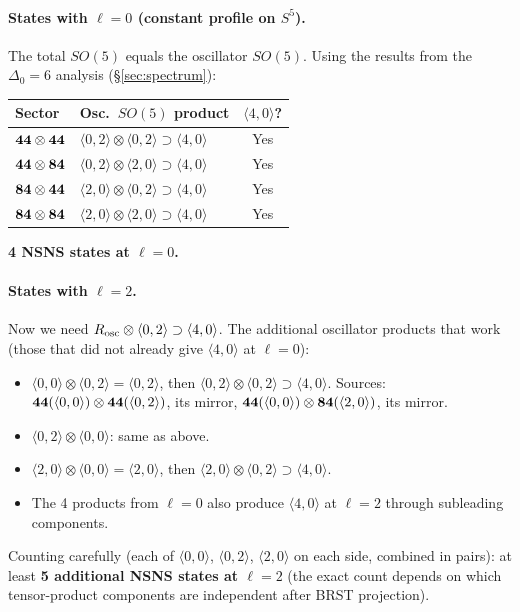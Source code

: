 \documentclass[12pt]{article}
\newcommand{\D}{\ensuremath{\Delta}}
\begin{document}
\paragraph{States with $\ell=0$ (constant profile on $S^5$).}
The total $SO(5)$ equals the oscillator $SO(5)$. Using the results from the
$\D_0=6$ analysis (\S\ref{sec:spectrum}):
\begin{center}
\begin{tabular}{|l|l|c|}
\hline
Sector & Osc.\ $SO(5)$ product & $\langle 4,0\rangle$? \\
\hline
${\bf 44}\otimes{\bf 44}$ & $\langle 0,2\rangle\otimes\langle 0,2\rangle\supset\langle 4,0\rangle$ & Yes \\
${\bf 44}\otimes{\bf 84}$ & $\langle 0,2\rangle\otimes\langle 2,0\rangle\supset\langle 4,0\rangle$ & Yes \\
${\bf 84}\otimes{\bf 44}$ & $\langle 2,0\rangle\otimes\langle 0,2\rangle\supset\langle 4,0\rangle$ & Yes \\
${\bf 84}\otimes{\bf 84}$ & $\langle 2,0\rangle\otimes\langle 2,0\rangle\supset\langle 4,0\rangle$ & Yes \\
\hline
\end{tabular}
\end{center}
\textbf{4 NSNS states at $\ell=0$.}

\paragraph{States with $\ell=2$.}
Now we need $R_{\rm osc}\otimes\langle 0,2\rangle\supset\langle 4,0\rangle$.
The additional oscillator products that work (those that did not already give
$\langle 4,0\rangle$ at $\ell=0$):
\begin{itemize}
\item $\langle 0,0\rangle\otimes\langle 0,2\rangle=\langle 0,2\rangle$, then
$\langle 0,2\rangle\otimes\langle 0,2\rangle\supset\langle 4,0\rangle$. Sources:
${\bf 44}(\langle 0,0\rangle)\otimes{\bf 44}(\langle 0,2\rangle)$, its mirror,
${\bf 44}(\langle 0,0\rangle)\otimes{\bf 84}(\langle 2,0\rangle)$, its mirror.
\item $\langle 0,2\rangle\otimes\langle 0,0\rangle$: same as above.
\item $\langle 2,0\rangle\otimes\langle 0,0\rangle=\langle 2,0\rangle$, then
$\langle 2,0\rangle\otimes\langle 0,2\rangle\supset\langle 4,0\rangle$.
\item The 4 products from $\ell=0$ also produce $\langle 4,0\rangle$ at $\ell=2$
through subleading components.
\end{itemize}
Counting carefully (each of $\langle 0,0\rangle$, $\langle 0,2\rangle$, $\langle 2,0\rangle$
on each side, combined in pairs): at least \textbf{5 additional NSNS states at $\ell=2$}
(the exact count depends on which tensor-product components are independent after
BRST projection).
\end{document}

